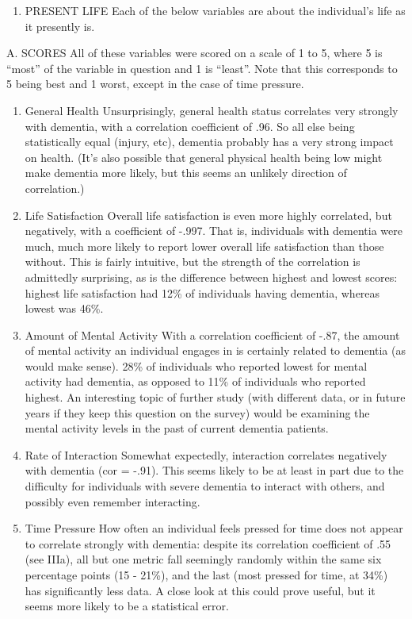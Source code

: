 \documentclass[]{article}
\providecommand{\tightlist}{%
  \setlength{\itemsep}{0pt}\setlength{\parskip}{0pt}}
\begin{document}
\begin{enumerate}
\def\labelenumi{\Roman{enumi}.}
\setcounter{enumi}{1}
\tightlist
\item
  PRESENT LIFE Each of the below variables are about the individual's
  life as it presently is.
\end{enumerate}

A. SCORES All of these variables were scored on a scale of 1 to 5, where
5 is ``most'' of the variable in question and 1 is ``least''. Note that
this corresponds to 5 being best and 1 worst, except in the case of time
pressure.

\begin{enumerate}
\def\labelenumi{\alph{enumi}.}
\item
  General Health Unsurprisingly, general health status correlates very
  strongly with dementia, with a correlation coefficient of .96. So all
  else being statistically equal (injury, etc), dementia probably has a
  very strong impact on health. (It's also possible that general
  physical health being low might make dementia more likely, but this
  seems an unlikely direction of correlation.)
\item
  Life Satisfaction Overall life satisfaction is even more highly
  correlated, but negatively, with a coefficient of -.997. That is,
  individuals with dementia were much, much more likely to report lower
  overall life satisfaction than those without. This is fairly
  intuitive, but the strength of the correlation is admittedly
  surprising, as is the difference between highest and lowest scores:
  highest life satisfaction had 12\% of individuals having dementia,
  whereas lowest was 46\%.
\item
  Amount of Mental Activity With a correlation coefficient of -.87, the
  amount of mental activity an individual engages in is certainly
  related to dementia (as would make sense). 28\% of individuals who
  reported lowest for mental activity had dementia, as opposed to 11\%
  of individuals who reported highest. An interesting topic of further
  study (with different data, or in future years if they keep this
  question on the survey) would be examining the mental activity levels
  in the past of current dementia patients.
\item
  Rate of Interaction Somewhat expectedly, interaction correlates
  negatively with dementia (cor = -.91). This seems likely to be at
  least in part due to the difficulty for individuals with severe
  dementia to interact with others, and possibly even remember
  interacting.
\item
  Time Pressure How often an individual feels pressed for time does not
  appear to correlate strongly with dementia: despite its correlation
  coefficient of .55 (see IIIa), all but one metric fall seemingly
  randomly within the same six percentage points (15 - 21\%), and the
  last (most pressed for time, at 34\%) has significantly less data. A
  close look at this could prove useful, but it seems more likely to be
  a statistical error.
\end{enumerate}
\end{document}
